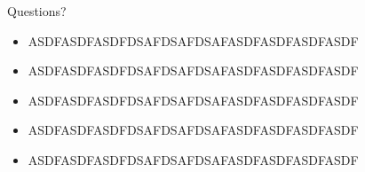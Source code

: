 \documentclass{beamer}
\begin{document}
\begin{frame}{Questions?}
\begin{itemize}
\item ASDFASDFASDFDSAFDSAFDSAFASDFASDFASDFASDF
\item ASDFASDFASDFDSAFDSAFDSAFASDFASDFASDFASDF
\item ASDFASDFASDFDSAFDSAFDSAFASDFASDFASDFASDF
\item ASDFASDFASDFDSAFDSAFDSAFASDFASDFASDFASDF
\item ASDFASDFASDFDSAFDSAFDSAFASDFASDFASDFASDF
\end{itemize}
\end{frame}
\end{document}
